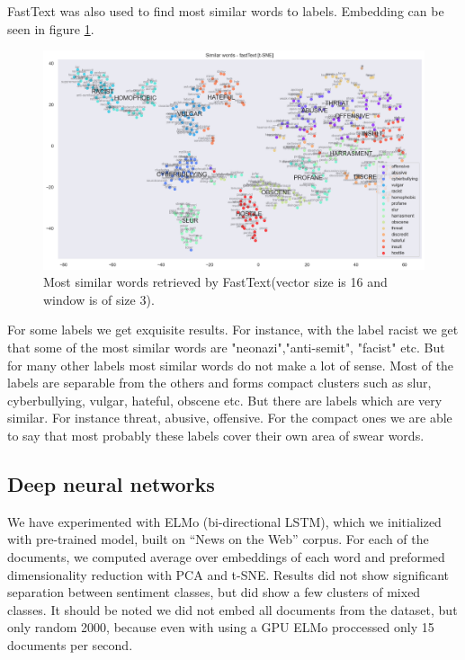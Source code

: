 \documentclass[fleqn,moreauthors,10pt]{ds_report}
\begin{document}
FastText was also used to find most similar words to labels. Embedding can be seen in figure \ref{fig:fasttext_embedding}.
\begin{figure}
    \centering
    \includegraphics[width=\textwidth]{fig/SimilarWords - fastText - t-SNE.png}
    \caption{Most similar words retrieved by FastText(vector size is 16 and window is of size 3).}
    \label{fig:fasttext_embedding}
\end{figure}
For some labels we get exquisite results. For instance, with the label racist we get that some of the most similar words are "neonazi","anti-semit", "facist" etc. But for many other labels most similar words do not make a lot of sense. Most of the labels are separable from the others and forms compact clusters such as slur, cyberbullying, vulgar, hateful, obscene etc. But there are labels which are very similar. For instance threat, abusive, offensive. For the compact ones we are able to say that most probably these labels cover their own area of swear words.

\subsection*{Deep neural networks}

We have experimented with ELMo \cite{ElmoSemEval} (bi-directional LSTM), which we initialized with pre-trained model, built on ``News on the Web'' corpus. For each of the documents, we computed average over embeddings of each word and preformed dimensionality reduction with PCA and t-SNE. Results did not show significant separation between sentiment classes, but did show a few clusters of mixed classes. It should be noted we did not embed all documents from the dataset, but only random 2000, because even with using a GPU ELMo proccessed only 15 documents per second.
\end{document}
